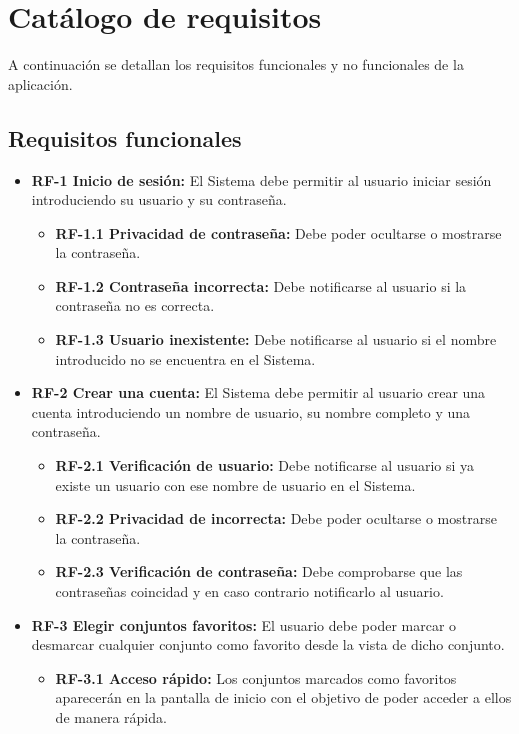 \section{Catálogo de requisitos}\label{catalogo-de-requisitos}

A continuación se detallan los requisitos funcionales y no funcionales de la aplicación.

\subsection{\textbf{Requisitos funcionales}}

\begin{itemize}
    \item \textbf{RF-1 Inicio de sesión:} El Sistema debe permitir al usuario iniciar sesión introduciendo su usuario y su contraseña.
    \begin{itemize}
        \item \textbf{RF-1.1 Privacidad de contraseña:} Debe poder ocultarse o mostrarse la contraseña.
        \item \textbf{RF-1.2 Contraseña incorrecta:} Debe notificarse al usuario si la contraseña no es correcta.
        \item \textbf{RF-1.3 Usuario inexistente:} Debe notificarse al usuario si el nombre introducido no se encuentra en el Sistema.
    \end{itemize}

    \item \textbf{RF-2 Crear una cuenta:} El Sistema debe permitir al usuario crear una cuenta introduciendo un nombre de usuario, su nombre completo y una contraseña.
    \begin{itemize}
        \item \textbf{RF-2.1 Verificación de usuario:} Debe notificarse al usuario si ya existe un usuario con ese nombre de usuario en el Sistema.
        \item \textbf{RF-2.2 Privacidad de incorrecta:} Debe poder ocultarse o mostrarse la contraseña.
        \item \textbf{RF-2.3 Verificación de contraseña:} Debe comprobarse que las contraseñas coincidad y en caso contrario notificarlo al usuario.
    \end{itemize}

    \item \textbf{RF-3 Elegir conjuntos favoritos:} El usuario debe poder marcar o desmarcar cualquier conjunto como favorito desde la vista de dicho conjunto.
    \begin{itemize}
        \item \textbf{RF-3.1 Acceso rápido:} Los conjuntos marcados como favoritos aparecerán en la pantalla de inicio con el objetivo de poder acceder a ellos de manera rápida.
    \end{itemize}


\end{itemize}
